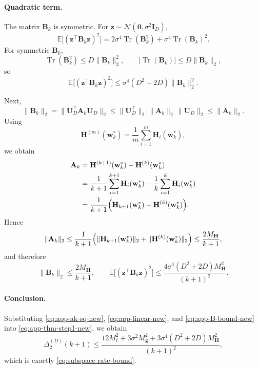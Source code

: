 \documentclass[10pt]{article}
\theoremstyle{plain}
\theoremstyle{remark}
\begin{document}
\paragraph{Quadratic term.}
The matrix $\mathbf B_k$ is symmetric.
For $\mathbf z\sim\mathcal N(\mathbf 0,\sigma^2\mathbf I_D)$,
\begin{equation}
\label{eq:app-quad-moment-new}
\mathbb E\bigl[(\mathbf z^\top\mathbf B_k\mathbf z)^2\bigr]
=
2\sigma^4 \operatorname{Tr}(\mathbf B_k^2)
+
\sigma^4 \operatorname{Tr}(\mathbf B_k)^2.
\end{equation}
For symmetric $\mathbf B_k$,
\[
\operatorname{Tr}(\mathbf B_k^2)\le D\|\mathbf B_k\|_2^2,
\qquad
|\operatorname{Tr}(\mathbf B_k)|\le D\|\mathbf B_k\|_2,
\]
so
\begin{equation}
\label{eq:app-quad-bound-new}
\mathbb E\bigl[(\mathbf z^\top\mathbf B_k\mathbf z)^2\bigr]
\le
\sigma^4(D^2+2D)\|\mathbf B_k\|_2^2.
\end{equation}

Next,
\[
\|\mathbf B_k\|_2
=
\|\mathbf U_D^\top \mathbf A_k \mathbf U_D\|_2
\le
\|\mathbf U_D^\top\|_2\,\|\mathbf A_k\|_2\,\|\mathbf U_D\|_2
\le
\|\mathbf A_k\|_2.
\]
Using
\[
\mathbf H^{(m)}(\mathbf w_k^*)
=
\frac1m\sum_{i=1}^m \mathbf H_i(\mathbf w_k^*),
\]
we obtain
\begin{align*}
\mathbf A_k
&=
\mathbf H^{(k+1)}(\mathbf w_k^*)-\mathbf H^{(k)}(\mathbf w_k^*)
\\
&=
\frac{1}{k+1}\sum_{i=1}^{k+1}\mathbf H_i(\mathbf w_k^*)
-
\frac{1}{k}\sum_{i=1}^{k}\mathbf H_i(\mathbf w_k^*)
\\
&=
\frac{1}{k+1}
\Bigl(
\mathbf H_{k+1}(\mathbf w_k^*)-\mathbf H^{(k)}(\mathbf w_k^*)
\Bigr).
\end{align*}
Hence
\[
\|\mathbf A_k\|_2
\le
\frac{1}{k+1}
\Bigl(
\|\mathbf H_{k+1}(\mathbf w_k^*)\|_2
+
\|\mathbf H^{(k)}(\mathbf w_k^*)\|_2
\Bigr)
\le
\frac{2M_{\mathbf H}}{k+1},
\]
and therefore
\begin{equation}
\label{eq:app-B-bound-new}
\|\mathbf B_k\|_2\le \frac{2M_{\mathbf H}}{k+1},
\qquad
\mathbb E\bigl[(\mathbf z^\top\mathbf B_k\mathbf z)^2\bigr]
\le
\frac{4\sigma^4(D^2+2D)M_{\mathbf H}^2}{(k+1)^2}.
\end{equation}

\paragraph{Conclusion.}
Substituting \eqref{eq:app-ak-sq-new}, \eqref{eq:app-linear-new}, and \eqref{eq:app-B-bound-new} into \eqref{eq:app-thm-step1-new}, we obtain
\[
\Delta_2^{(D)}(k+1)
\le
\frac{
12M_\ell^2
+
3\sigma^2M_{\mathbf g}^2
+
3\sigma^4(D^2+2D)M_{\mathbf H}^2
}{(k+1)^2},
\]
which is exactly \eqref{eq:subspace-rate-bound}.
\end{document}
